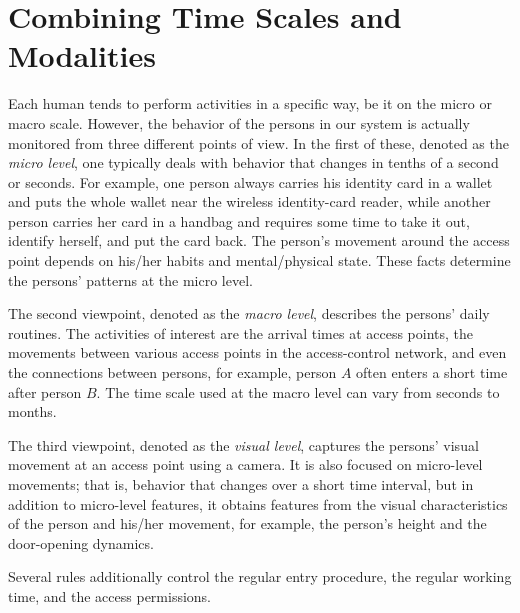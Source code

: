 




%
%
\chapter{Combining Time Scales and Modalities}
\label{chap:combine}

Each human tends to perform activities in a specific way, be it on the micro or macro scale. However, the behavior of the persons in our system is actually monitored from three different points of view. In the first of these, denoted as the \textit{micro level}, one typically deals with behavior that changes in tenths of a second or seconds. For example, one person always carries his identity card in a wallet and puts the whole wallet near the wireless identity-card reader, while another person carries her card in a handbag and requires some time to take it out, identify herself, and put the card back. The person's movement around the access point depends on his/her habits and mental/physical state. These facts determine the persons' patterns at the micro level.

The second viewpoint, denoted as the \textit{macro level}, describes the persons' daily routines. The activities of interest are the arrival times at access points, the movements between various access points in the access-control network, and even the connections between persons, for example, person $A$ often enters a short time after person $B$. The time scale used at the macro level can vary from seconds to months.

The third viewpoint, denoted as the \textit{visual level}, captures the persons' visual movement at an access point using a camera. It is also focused on micro-level movements; that is, behavior that changes over a short time interval, but in addition to micro-level features, it obtains features from the visual characteristics of the person and his/her movement, for example, the person's height and the door-opening dynamics.

Several rules additionally control the regular entry procedure, the regular working time, and the access permissions.



